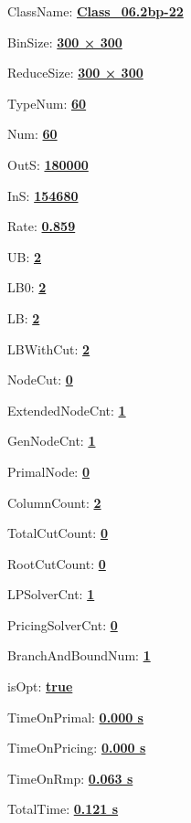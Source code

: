 \documentclass[11pt]{article}
\begin{document}
\pagestyle{empty}


ClassName: \underline{\textbf{Class_06.2bp-22}}
\par
BinSize: \underline{\textbf{300 × 300}}
\par
ReduceSize: \underline{\textbf{300 × 300}}
\par
TypeNum: \underline{\textbf{60}}
\par
Num: \underline{\textbf{60}}
\par
OutS: \underline{\textbf{180000}}
\par
InS: \underline{\textbf{154680}}
\par
Rate: \underline{\textbf{0.859}}
\par
UB: \underline{\textbf{2}}
\par
LB0: \underline{\textbf{2}}
\par
LB: \underline{\textbf{2}}
\par
LBWithCut: \underline{\textbf{2}}
\par
NodeCut: \underline{\textbf{0}}
\par
ExtendedNodeCnt: \underline{\textbf{1}}
\par
GenNodeCnt: \underline{\textbf{1}}
\par
PrimalNode: \underline{\textbf{0}}
\par
ColumnCount: \underline{\textbf{2}}
\par
TotalCutCount: \underline{\textbf{0}}
\par
RootCutCount: \underline{\textbf{0}}
\par
LPSolverCnt: \underline{\textbf{1}}
\par
PricingSolverCnt: \underline{\textbf{0}}
\par
BranchAndBoundNum: \underline{\textbf{1}}
\par
isOpt: \underline{\textbf{true}}
\par
TimeOnPrimal: \underline{\textbf{0.000 s}}
\par
TimeOnPricing: \underline{\textbf{0.000 s}}
\par
TimeOnRmp: \underline{\textbf{0.063 s}}
\par
TotalTime: \underline{\textbf{0.121 s}}
\par
\newpage
\end{document}
